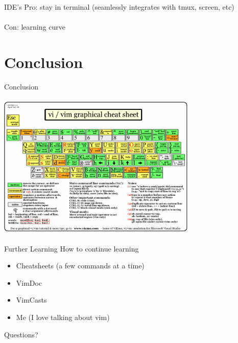 \documentclass{beamer}
\begin{document}
            \begin{frame}{IDE's}
                Pro: stay in terminal (seamlessly integrates with tmux, screen, etc) \\~\\
                \pause
                Con: learning curve
            \end{frame}

    \section*{Conclusion}

            \begin{frame}{Conclusion}
                \begin{center}
                \includegraphics[width = 9.5cm, height = 7cm]{vi_vim_cheat_sheet.png}
                \end{center}
            \end{frame}


            \begin{frame}{Further Learning}
                How to continue learning
                \begin{itemize}
                    \item Cheatsheets (a few commands at a time)
                    \item VimDoc
                    \item VimCasts
                    \pause
                    \item Me \pause (I love talking about vim)
                \end{itemize}
            \end{frame}

            \begin{frame}{Questions?}
            \end{frame}
\end{document}
